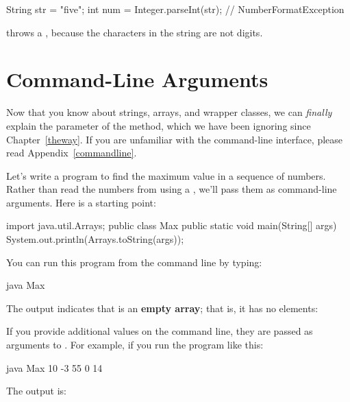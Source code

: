 \begin{code}
String str = "five";
int num = Integer.parseInt(str);  // NumberFormatException
\end{code}

 throws a , because the characters in the string  are not digits.


\section{Command-Line Arguments}


Now that you know about strings, arrays, and wrapper classes, we can {\em finally} explain the  parameter of the  method, which we have been ignoring since Chapter~\ref{theway}.
If you are unfamiliar with the command-line interface, please read Appendix~\ref{commandline}.

Let's write a program to find the maximum value in a sequence of numbers.
Rather than read the numbers from  using a , we'll pass them as command-line arguments.
Here is a starting point:

\begin{code}
import java.util.Arrays;
public class Max {
    public static void main(String[] args) {
        System.out.println(Arrays.toString(args));
    }
}
\end{code}

You can run this program from the command line by typing:

\begin{stdout}
java Max
\end{stdout}


The output indicates that  is an {\bf empty array}; that is, it has no elements:

\begin{stdout}
[]
\end{stdout}

If you provide additional values on the command line, they are passed as arguments to .
For example, if you run the program like this:

\begin{stdout}
java Max 10 -3 55 0 14
\end{stdout}

The output is:

